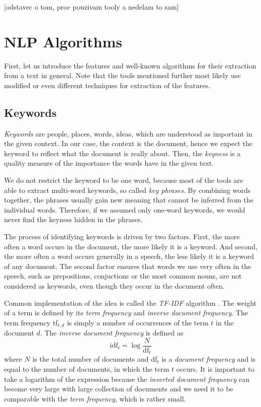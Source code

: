 \documentclass[
  digital, %
  table,   %
  lof,     %
  lot,     %
]{fithesis3}
\begin{document}
[odstavec o tom, proc pouzivam tooly a nedelam to sam]

\section{NLP Algorithms}
First, let us introduce the features and well-known algorithms for their extraction from a text in general.
Note that the tools mentioned further most likely use modified or even different techniques for extraction of the features.

\subsection{Keywords}
\emph{Keywords} are people, places, words, ideas, which are understood as important in the given context. 
In our case, the context is the document, hence we expect the keyword to reflect what the document is really about.
Then, the \textit{keyness} is a quality measure of the importance the words have in the given text.
\cite[ch. 4]{scott2006textual}

We do not restrict the keyword to be one word, because most of the tools are able to extract multi-word keywords, so called \textit{key phrases}.
By combining words together, the phrases usually gain new meaning that cannot be inferred from the individual words.
Therefore, if we assumed only one-word keywords, we would never find the keyness hidden in the phrases.

The process of identifying keywords is driven by two factors.
First, the more often a word occurs in the document, the more likely it is a keyword.
And second, the more often a word occurs generally in a speech, the less likely it is a keyword of any document.
\cite[ch. 4]{scott2006textual}
The second factor ensures that words we use very often in the speech, such as prepositions, conjuctions or the most common nouns, are not considered as keywords, even though they occur in the document often.

Common implementation of the idea is called the \textit{TF-IDF} algorithm \cite[ch. 6]{manning2008introduction}.
The weight of a term is defined by its \textit{term frequency} and \textit{inverse document frequency}.
The term frequency tf$_{t,d}$ is simply a number of occurrences of the term $t$ in the document $d$. The \textit{inverse document frequency} is defined as
$$
\text{idf}_t = \log{\frac{N}{\text{df}_t}}
$$
where $N$ is the total number of documents and df$_{t}$ is a \textit{document frequency} and is equal to the number of documents, in which the term $t$ occurs.
It is important to take a logarithm of the expression because the \textit{inverted document frequency} can become very large with large collection of documents and we need it to be comparable with the \textit{term frequency}, which is rather small.
\end{document}

